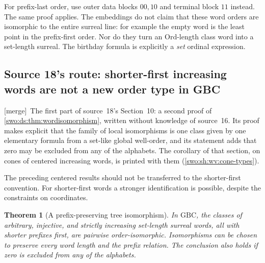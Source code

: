 \documentclass[11pt]{article}
\newtheorem{theorem}{Theorem}[section]
\theoremstyle{definition}
\theoremstyle{remark}
\newcommand{\Ord}{\mathrm{Ord}}
\newcommand{\merge}{\textsf{[merge]}}
\begin{document}
For prefix-last order, use outer data blocks $00,10$ and terminal
block $11$ instead. The same proof applies. The embeddings do not claim
that these word orders are isomorphic to the entire surreal line: for
example the empty word is the least point in the prefix-first order.
Nor do they turn an $\Ord$-length class word into a set-length surreal.
The birthday formula is explicitly a \emph{set} ordinal expression.

\subsection{Source 18's route: shorter-first increasing words are not a new order type in GBC}\label{swo:vii:sub:sh-tree}

\merge\ The first part of source~18's Section~10: a second proof of
\cref{swo:ds:thm:wordisomorphism}, written without knowledge of source~16.
Its proof makes explicit that the family of local isomorphisms is one class
given by one elementary formula from a set-like global well-order, and its
statement adds that zero may be excluded from any of the alphabets. The
corollary of that section, on cones of centered increasing words, is printed
with them (\cref{swo:sh:wv:cone-types}).
\label{swo:sh:wv:prefix-isomorphism}

The preceding centered results should not be transferred to the
shorter-first convention.  For shorter-first words a stronger
identification is possible, despite the constraints on coordinates.

\begin{theorem}[A prefix-preserving tree isomorphism]
\label{swo:sh:wv:tree-isomorphism}
In \(\mathrm{GBC}\), the classes of arbitrary, injective, and
strictly increasing set-length surreal words, all with shorter
prefixes first, are pairwise order-isomorphic.  Isomorphisms can
be chosen to preserve every word length and the prefix relation.
The conclusion also holds if zero is excluded from any of the
alphabets.
\end{theorem}
\end{document}
